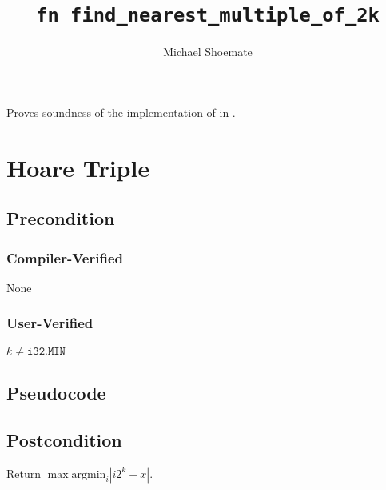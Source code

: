 \documentclass{article}
\title{\texttt{fn find\_nearest\_multiple\_of\_2k}}
\author{Michael Shoemate}
\date{}
\begin{document}
\maketitle

\contrib
Proves soundness of the implementation of  in .

\section{Hoare Triple}
\subsection*{Precondition}
\subsubsection*{Compiler-Verified}
None

\subsubsection*{User-Verified}
$k \neq \texttt{i32.MIN}$

\subsection*{Pseudocode}


\subsection*{Postcondition}
\begin{theorem}
    Return $\max \mathrm{argmin}_i |i 2^k - x|$.
\end{theorem}
\end{document}
